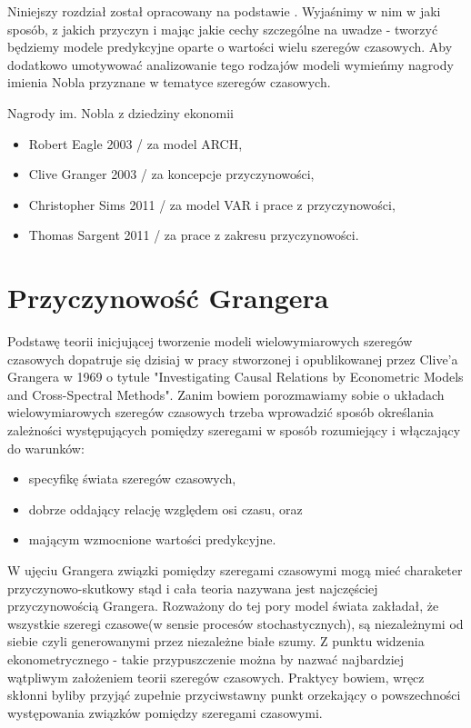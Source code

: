 \documentclass[10pt,a4paper]{book}
\begin{document}
Niniejszy rozdział został opracowany na podstawie \citep{kirchgassner2012introduction}. Wyjaśnimy w nim w jaki sposób, z jakich przyczyn i mając jakie cechy szczególne na uwadze - tworzyć będziemy modele predykcyjne oparte o wartości wielu szeregów czasowych. Aby dodatkowo umotywować analizowanie tego rodzajów modeli wymieńmy nagrody imienia Nobla przyznane w tematyce szeregów czasowych.

Nagrody im. Nobla z dziedziny ekonomii 
\begin{itemize}
\item Robert Eagle 2003 / za model ARCH,
\item Clive Granger 2003 / za koncepcje przyczynowości,
\item Christopher Sims 2011 / za model VAR i prace z przyczynowości,
\item Thomas Sargent 2011 / za prace z zakresu przyczynowości.
\end{itemize}

\section{Przyczynowość Grangera}

Podstawę teorii inicjującej tworzenie modeli wielowymiarowych szeregów czasowych dopatruje się dzisiaj w pracy stworzonej i opublikowanej przez Clive'a Grangera w 1969 o tytule "Investigating Causal Relations by Econometric Models and Cross-Spectral Methods". Zanim bowiem porozmawiamy sobie o układach wielowymiarowych szeregów czasowych trzeba wprowadzić sposób określania zależności występujących pomiędzy szeregami w sposób rozumiejący i włączający do warunków:
\begin{itemize}
\item specyfikę świata szeregów czasowych,
\item dobrze oddający relację względem osi czasu, oraz
\item mającym wzmocnione wartości predykcyjne. 
\end{itemize}    
W ujęciu Grangera związki pomiędzy szeregami czasowymi mogą mieć charaketer przyczynowo-skutkowy stąd i cała teoria nazywana jest najczęściej przyczynowością Grangera. Rozważony do tej pory model świata zakładał, że wszystkie szeregi czasowe(w sensie procesów stochastycznych), są niezależnymi od siebie czyli generowanymi przez niezależne białe szumy. Z punktu widzenia ekonometrycznego - takie przypuszczenie można by nazwać najbardziej wątpliwym założeniem teorii szeregów czasowych. Praktycy bowiem, wręcz skłonni byliby przyjąć zupełnie przyciwstawny punkt orzekający o powszechności występowania związków pomiędzy szeregami czasowymi. 
\end{document}

